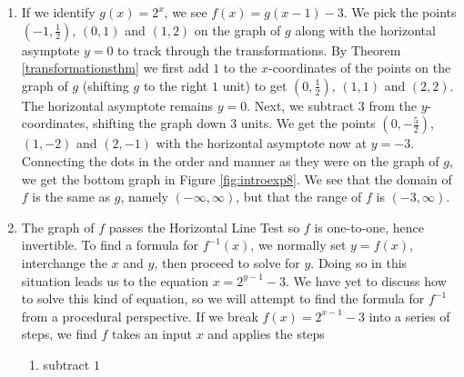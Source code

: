 {
\begin{enumerate}

\item  If we identify $g(x) = 2^{x}$, we see $f(x) = g(x-1)-3$.  We pick the points $\left(-1, \frac{1}{2}\right)$, $(0,1)$ and $(1, 2)$ on the graph of $g$ along with the horizontal asymptote $y=0$ to track through the transformations. By Theorem \ref{transformationsthm} we first add $1$ to the $x$-coordinates of the points on the graph of $g$ (shifting $g$ to the right $1$ unit) to get $\left(0, \frac{1}{2}\right)$, $(1,1)$ and $(2, 2)$.  The horizontal asymptote remains $y=0$.  Next, we subtract $3$ from the $y$-coordinates, shifting the graph down $3$ units.  We get the points $\left(0, -\frac{5}{2}\right)$, $(1,-2)$ and $(2, -1)$ with the horizontal asymptote now at $y=-3$.  Connecting the dots in the order and manner as they were on the graph of $g$, we get the bottom graph in Figure \ref{fig:introexp8}.  We see that the domain of $f$ is the same as $g$, namely $(-\infty, \infty)$, but that the range of $f$ is $(-3, \infty)$.



\item  The graph of $f$ passes the Horizontal Line Test so $f$ is one-to-one, hence invertible.  To find a formula for $f^{-1}(x)$, we normally set $y=f(x)$, interchange the $x$ and $y$, then proceed to solve for $y$.  Doing so in this situation leads us to the equation $x = 2^{y-1}-3$.  We have yet to discuss how to solve this kind of equation, so we will attempt to find the formula for $f^{-1}$ from a procedural perspective.  If we break $f(x) = 2^{x-1}-3$ into a series of steps, we find $f$ takes an input $x$ and applies the steps

\begin{enumerate}

\item subtract $1$


\end{enumerate}
\end{enumerate}}
